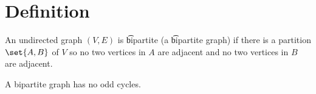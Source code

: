 
\section*{Definition}

An undirected graph $(V, E)$ is \t{bipartite} (a \t{bipartite graph}) if there is a partition $\set{A, B}$ of $V$ so no two vertices in $A$ are adjacent and no two vertices in $B$ are adjacent.

\begin{proposition}
A bipartite graph has no odd cycles.
\end{proposition}

\blankpage